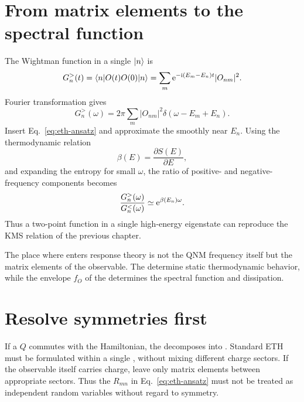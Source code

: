\section{From matrix elements to the spectral function}

The Wightman function in a single  $\lvert n \rangle$ is
\begin{equation}
G_n^>(t)
=
\langle n \rvert O(t)O(0)\lvert n \rangle
=
\sum_m
\mathrm{e}^{-\mathrm{i}(E_m-E_n)t}
|O_{nm}|^2.
\label{eq:eigenstate-wightman}
\end{equation}
Fourier transformation gives
\begin{equation}
G_n^>(\omega)
=
2\pi
\sum_m
|O_{nm}|^2
\delta\left(
\omega-E_m+E_n
\right).
\label{eq:eigenstate-spectral-sum}
\end{equation}
Insert Eq.~\eqref{eq:eth-ansatz} and approximate the  smoothly near $E_n$. Using the thermodynamic relation
\begin{equation}
\beta(E)
=
\frac{\partial S(E)}{\partial E},
\label{eq:microcanonical-beta}
\end{equation}
and expanding the entropy for small $\omega$, the ratio of positive- and negative-frequency components becomes
\begin{equation}
\frac{G_n^>(\omega)}{G_n^<(\omega)}
\simeq
\mathrm{e}^{\beta(E_n)\omega}.
\label{eq:eth-detailed-balance}
\end{equation}
Thus a  two-point function in a single high-energy eigenstate can reproduce the KMS  relation of the previous chapter.

\begin{principlebox}
The place where  enters response theory is not the QNM frequency itself but the matrix elements of the observable. The  determine static thermodynamic behavior, while the envelope $f_O$ of the  determines the spectral function and dissipation.
\end{principlebox}

\section{Resolve symmetries first}

If a  $Q$ commutes with the Hamiltonian, the  decomposes into . Standard ETH must be formulated within a single , without mixing different charge sectors. If the observable itself carries charge,  leave only matrix elements between appropriate sectors. Thus the $R_{mn}$ in Eq.~\eqref{eq:eth-ansatz} must not be treated as independent random variables without regard to symmetry.

